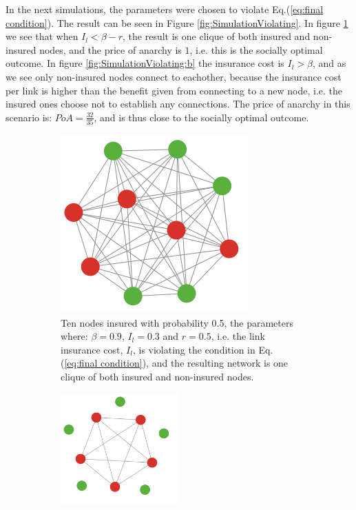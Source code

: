 In the next simulations, the parameters were chosen to violate Eq.(\ref{eq:final condition}). The result can be seen in Figure \ref{fig:SimulationViolating}.  In figure \ref{fig:SimulationViolating:a} we see that when $I_{l}<\beta-r$, the result is one clique of both insured and non-insured nodes, and the price of anarchy is $1$, i.e. this is the socially optimal outcome. In figure \ref{fig:SimulationViolating:b} the insurance cost is $I_{l}>\beta$, and as we see only non-insured nodes connect to eachother, because the insurance cost per link is higher than the benefit given from connecting to a new node, i.e. the insured ones choose not to establish any connections. The price of anarchy in this scenario is: $PoA=\frac{32}{35}$, and is thus close to the socially optimal outcome.
\begin{figure}[h]
\centering
\begin{subfigure}{.9\textwidth}
  \centering
\includegraphics[width=0.5\linewidth]{../Figures/FirstSimulationViolatingResult.png}

\caption{\label{fig:SimulationViolating:a} Ten nodes insured with probability 0.5, the parameters where: $\beta=0.9$, $I_{l}=0.3$ and $r=0.5$, i.e. the link insurance cost, $I_{l}$, is violating the condition in Eq.(\ref{eq:final condition}), and the resulting network is one clique of both insured and non-insured nodes.}
\end{subfigure}
\quad
\begin{subfigure}{0.9\textwidth}
\centering
\includegraphics[width=0.5\textwidth]{../Figures/SimulationViolating2.png}


\end{subfigure}
\end{figure}

